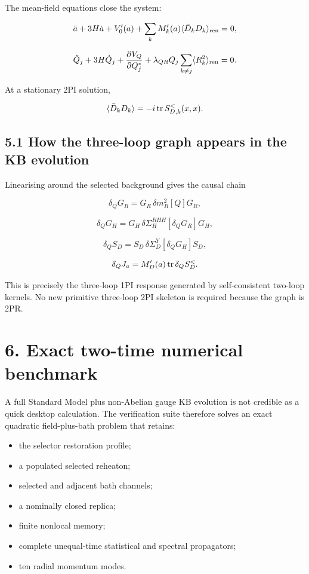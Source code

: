 \documentclass[
  10pt,
]{article}
\providecommand{\tightlist}{%
  \setlength{\itemsep}{0pt}\setlength{\parskip}{0pt}}
\begin{document}
The mean-field equations close the system:

\[
\ddot a+3H\dot a+V_0'(a)
+\sum_kM_k'(a)
\langle\bar D_kD_k\rangle_{\rm ren}=0,
\]

\[
\ddot Q_j+3H\dot Q_j
+\frac{\partial V_Q}{\partial Q_j^*}
+\lambda_{QR}Q_j\sum_{k\ne j}
\langle R_k^2\rangle_{\rm ren}=0.
\]

At a stationary 2PI solution,

\[
\langle\bar D_kD_k\rangle
=-i\,{\rm tr}\,S_{D,k}^{<}(x,x).
\]

\subsection{5.1 How the three-loop graph appears in the KB
evolution}\label{how-the-three-loop-graph-appears-in-the-kb-evolution}

Linearising around the selected background gives the causal chain

\[
\delta_QG_R
=G_R\,\delta m_R^2[Q]G_R,
\]

\[
\delta_QG_H
=G_H\,
\delta\Sigma_H^{RHH}[\delta_QG_R]
G_H,
\]

\[
\delta_QS_D
=S_D\,
\delta\Sigma_D^{Y}[\delta_QG_H]
S_D,
\]

\[
\delta_QJ_a
=
M_D'(a)\,{\rm tr}\,\delta_QS_D^<.
\]

This is precisely the three-loop 1PI response generated by
self-consistent two-loop kernels. No new primitive three-loop 2PI
skeleton is required because the graph is 2PR.

\section{6. Exact two-time numerical
benchmark}\label{exact-two-time-numerical-benchmark}

A full Standard Model plus non-Abelian gauge KB evolution is not
credible as a quick desktop calculation. The verification suite
therefore solves an exact quadratic field-plus-bath problem that
retains:

\begin{itemize}
\tightlist
\item
  the selector restoration profile;
\item
  a populated selected reheaton;
\item
  selected and adjacent bath channels;
\item
  a nominally closed replica;
\item
  finite nonlocal memory;
\item
  complete unequal-time statistical and spectral propagators;
\item
  ten radial momentum modes.
\end{itemize}
\end{document}

